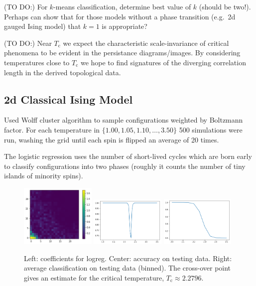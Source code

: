 \documentclass[11pt]{article}
\begin{document}
(TO DO:) For $k$-means classification, determine best value of $k$ (should be two!). Perhaps can show that for those models without a phase transition (e.g.~2d gauged Ising model) that $k=1$ is appropriate?

(TO DO:) Near $T_\text{c}$ we expect the characteristic scale-invariance of critical phenomena to be evident in the persistance diagrams/images. By considering temperatures close to $T_\text{c}$ we hope to find signatures of the diverging correlation length in the derived topological data.


\subsection{2d Classical Ising Model}
Used Wolff cluster algorithm to sample configurations weighted by Boltzmann factor. For each temperature in $\{1.00,1.05,1.10,\ldots,3.50\}$ 500 simulations were run, washing the grid until each spin is flipped an average of 20 times.

The logistic regression uses the number of short-lived cycles which are born early to classify configurations into two phases (roughly it counts the number of tiny islands of minority spins).

\begin{figure}[h]
    \centering
    \includegraphics[width=0.32\textwidth]{ising_images/logreg_2d_ising}
    \includegraphics[width=0.32\textwidth]{ising_images/logreg_acc_2d_ising}
    \includegraphics[width=0.32\textwidth]{ising_images/logreg_avg_2d_ising}
    \caption{Left: coefficients for logreg. Center: accuracy on testing data. Right: average classification on testing data (binned). The cross-over point gives an estimate for the critical temperature, $T_\text{c}\approx 2.2796$.}
\end{figure}
\end{document}

